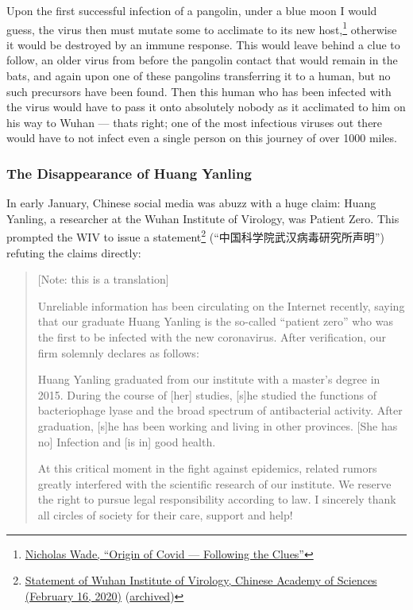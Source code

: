\documentclass[11pt]{article}
\begin{document}
Upon the first successful infection of a pangolin, under a blue moon I would guess, the virus then must mutate some to acclimate to its new host,\footnote{\href{https://nicholaswade.medium.com/origin-of-covid-following-the-clues-6f03564c038}{Nicholas Wade, ``Origin of Covid --- Following the Clues''}} otherwise it would be destroyed by an immune response. This would leave behind a clue to follow, an older virus from before the pangolin contact that would remain in the bats, and again upon one of these pangolins transferring it to a human, but no such precursors have been found. Then this human who has been infected with the virus would have to pass it onto absolutely nobody as it acclimated to him on his way to Wuhan --- thats right; one of the most infectious viruses out there would have to not infect even a single person on this journey of over 1000 miles.

\subsubsection{The Disappearance of Huang Yanling}
\label{sec:orge228069}
In early January, Chinese social media was abuzz with a huge claim: Huang Yanling, a researcher at the Wuhan Institute of Virology, was Patient Zero. This prompted the WIV to issue a statement\footnote{\href{https://www.whiov.ac.cn/tzgg\_105342/202002/t20200216\_5500201.html}{Statement of Wuhan Institute of Virology, Chinese Academy of Sciences (February 16, 2020)} (\href{https://archive.is/1enEo}{archived})} (``中国科学院武汉病毒研究所声明'') refuting the claims directly:
\begin{quote}
[Note: this is a translation]

Unreliable information has been circulating on the Internet recently, saying that our graduate Huang Yanling is the so-called ``patient zero'' who was the first to be infected with the new coronavirus. After verification, our firm solemnly declares as follows:

Huang Yanling graduated from our institute with a master’s degree in 2015. During the course of [her] studies, [s]he studied the functions of bacteriophage lyase and the broad spectrum of antibacterial activity. After graduation, [s]he has been working and living in other provinces. [She has no] Infection and [is in] good health.

At this critical moment in the fight against epidemics, related rumors greatly interfered with the scientific research of our institute. We reserve the right to pursue legal responsibility according to law. I sincerely thank all circles of society for their care, support and help!
\end{quote}
\end{document}
